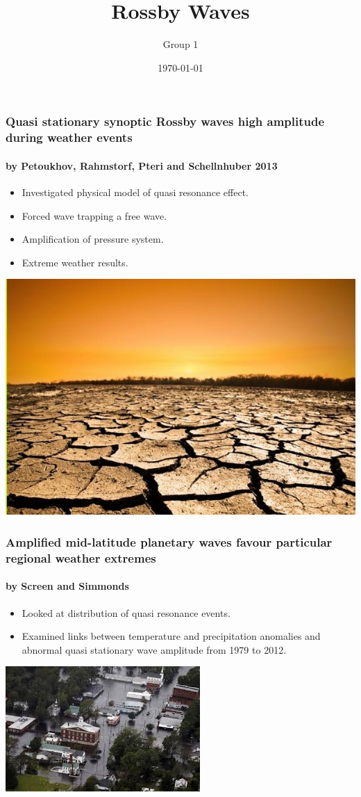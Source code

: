 \documentclass{beamer}
\title{Rossby Waves}
\author{Group 1}
\institute{MPE CDT }
\date{\today}
\begin{document}
	
	\frame{\titlepage}
 \begin{frame}
\frametitle{Quasi stationary synoptic Rossby waves high amplitude during weather events }
\framesubtitle{by Petoukhov, Rahmstorf, Pteri and Schellnhuber 2013}
\begin{itemize}
	\item Investigated physical model of quasi resonance effect.
	\item Forced wave trapping a free wave.
	\item Amplification of pressure system.
	\item Extreme weather results.
\end{itemize}
\centering\includegraphics[height=0.4\textheight]{drought}

\end{frame}
\begin{frame}
\frametitle{Amplified mid-latitude planetary waves favour particular regional weather extremes}
\framesubtitle{ 
by Screen and Simmonds }
\begin{itemize}
\item Looked at distribution of quasi resonance events.
\item Examined links between temperature and precipitation anomalies and abnormal quasi stationary wave amplitude from 1979 to 2012.

\end{itemize}
\centering\includegraphics[height=0.4\textheight]{flood}
\end{frame}
\end{document}

